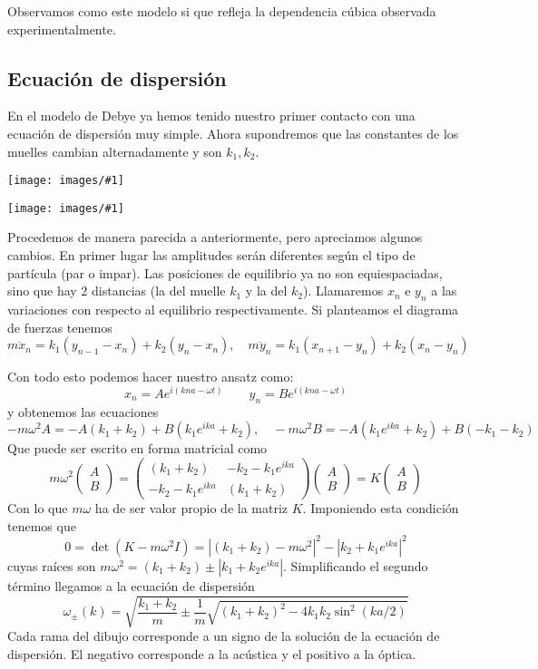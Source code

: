 \documentclass[leqno]{article}
\newcommand{\incimg}[1]{%
\center
\texttt{[image: images/\#1]}
}
\begin{document}
Observamos como este modelo si que refleja la dependencia cúbica observada experimentalmente.

\subsection{Ecuación de dispersión}
En el modelo de Debye ya hemos tenido nuestro primer contacto con una ecuación de dispersión muy simple. Ahora supondremos que las constantes de los muelles cambian alternadamente y son $k_1, k_2$.

\begin{minipage}{0.49\textwidth}
\incimg{prob2_3chain.png}
\end{minipage}
\begin{minipage}{0.49\textwidth}
\incimg{prob2_3.png}
\end{minipage}

Procedemos de manera parecida a anteriormente, pero apreciamos algunos cambios. En primer lugar las amplitudes serán diferentes según el tipo de partícula (par o impar). Las posiciones de equilibrio ya no son equiespaciadas, sino que hay 2 distancias (la del muelle $k_1$ y la del $k_2$). Llamaremos $x_n$ e  $y_n$ a las variaciones con respecto al equilibrio respectivamente. Si planteamos el diagrama de fuerzas tenemos
\[
m\ddot{x}_n = k_1(y_{n-1}-x_n)+k_2(y_n-x_n), \quad 
m\ddot{y}_n = k_1(x_{n+1}-y_n)+k_2(x_n-y_n)
\] 

Con todo esto podemos hacer nuestro ansatz como:
\[
x_n = A e^{i(kna-\omega t)} \qquad
y_n = B e^{i(kna-\omega t)}
\] 
y obtenemos las ecuaciones
\[
-m\omega ^2 A = -A(k_1+k_2)+ B(k_1e^{ika}+k_2), \quad 
-m\omega ^2 B = -A(k_1e^{ika}+k_2)+ B(-k_1-k_2)
\] 
Que puede ser escrito en forma matricial como
\[
  m\omega ^2 \begin{pmatrix} A\\B \end{pmatrix} = \begin{pmatrix} (k_1+k_2) & -k_2 -k_1e^{ika} \\ -k_2-k_1e^{ika} & (k_1+k_2) \end{pmatrix}  \begin{pmatrix} A\\B \end{pmatrix} = K\begin{pmatrix} A\\B \end{pmatrix} 
\] 
Con lo que $m\omega $ ha de ser valor propio de la matriz $K$. Imponiendo esta condición tenemos que
 \[
0 = \det(K-m\omega ^2I) = |(k_1+k_2)-m\omega ^2|^2 - |k_2 +k_1e^{ika}|^2
\] 
cuyas raíces son $m\omega^2 = (k_1+k_2) \pm |k_1+k_2e^{ika}|$. Simplificando el segundo término llegamos a la ecuación de dispersión 
\[
  \boxed{\omega _{\pm}(k) = \sqrt{ \frac{k_1+k_2}{m}\pm \frac{1}{m} \sqrt{(k_1+k_2)^2-4k_1k_2\sin^2(ka / 2)} } }
\] 
Cada rama del dibujo corresponde a un signo de la solución de la ecuación de dispersión. El negativo corresponde a la acústica y el positivo a la óptica.
\end{document}
